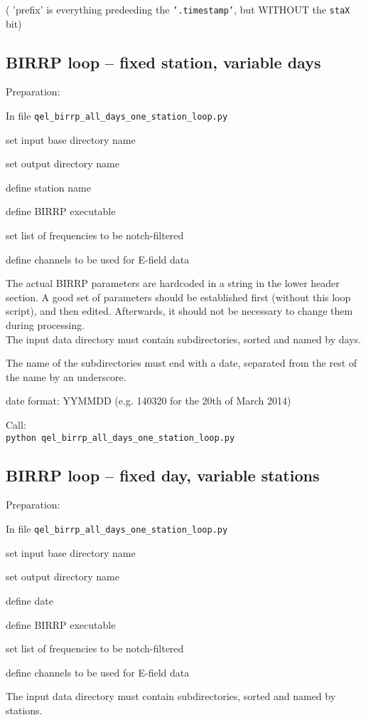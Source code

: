 \documentclass[11pt,DIV=12]{scrartcl}
\begin{document}
( 'prefix' is everything predeeding the \texttt{'.timestamp'}, but WITHOUT the \texttt{staX} bit)


\subsection{BIRRP loop -- fixed station, variable days}

Preparation:

In file \texttt{qel\_birrp\_all\_days\_one\_station\_loop.py}
\begin{itemize*}
\item set input base directory name 
\item set output directory name 
\item define station name
\item define BIRRP executable
\item set list of frequencies to be notch-filtered
\item define channels to be used for E-field data
\end{itemize*}

The actual BIRRP parameters are hardcoded in a string in the lower header section. A good set of parameters should be established first (without this loop script), and then edited. Afterwards, it should not be necessary to change them during processing.\\


The input data directory must contain subdirectories, sorted and named by days.


The name of the subdirectories must end with a date, separated from the rest
of the name by an underscore.

date format: YYMMDD (e.g. 140320 for the 20th of March 2014) 


Call:\\

\texttt{python qel\_birrp\_all\_days\_one\_station\_loop.py}


\subsection{BIRRP loop -- fixed day, variable stations}

Preparation:

In file \texttt{qel\_birrp\_all\_days\_one\_station\_loop.py}
\begin{itemize*}
\item set input base directory name 
\item set output directory name 
\item define date 
\item define BIRRP executable
\item set list of frequencies to be notch-filtered
\item define channels to be used for E-field data
\end{itemize*}
The input data directory must contain subdirectories, sorted and named by stations.
\end{document}
